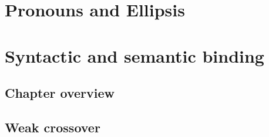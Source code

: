 \documentclass[a4paper]{article}
\begin{document}
\section{Pronouns and Ellipsis}

\section{Syntactic and semantic binding}

\subsection{Chapter overview}

\subsection{Weak crossover}
\end{document}
